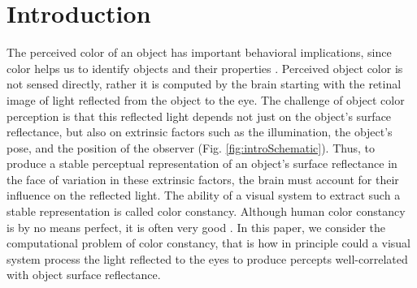 \documentclass{jov}
\begin{document}
\section{Introduction}
The perceived color of an object has important behavioral implications, since color helps us to identify objects and their properties \cite{Mollon89, Jacobs81}.
Perceived object color is not sensed directly, rather it is computed by the brain starting with the retinal image of light reflected from the object to the eye.
The challenge of object color perception is that this reflected light depends not just on the object's surface reflectance, but also on extrinsic factors such as the illumination, the object's pose,
and the position of the observer (Fig. \ref{fig:introSchematic}).
Thus, to produce a stable perceptual representation of an object's surface reflectance in the face of variation in these extrinsic factors, the brain must account for their influence on the reflected light.
The ability of a visual system to extract such a stable representation is called color constancy. Although human color constancy is by no means perfect, it is often very good \cite{FosterColorConstancy, BrainardColorConstancy}. 
In this paper, we consider the computational problem of color constancy, that is how in principle could a visual system process the light reflected to the eyes to produce percepts well-correlated with object surface reflectance.
\end{document}

